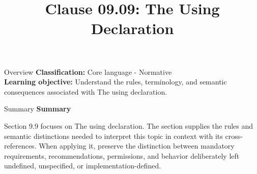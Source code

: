 \documentclass[10pt,letterpaper]{article}
\title{Clause 09.09: The Using Declaration}
\author{}
\date{}
\begin{document}
\maketitle
\begin{CornellOverviewBox}{Overview}
\textbf{Classification:} Core language - Normative\\[2pt]
\textbf{Learning objective:} Understand the rules, terminology, and semantic consequences associated with The using declaration.
\end{CornellOverviewBox}\begin{CornellSummaryBox}{Summary}
{\sffamily\bfseries\color{Accent} Summary}\par\vspace{3pt}Section 9.9 focuses on The using declaration. The section supplies the rules and semantic distinctions needed to interpret this topic in context with its cross-references. When applying it, preserve the distinction between mandatory requirements, recommendations, permissions, and behavior deliberately left undefined, unspecified, or implementation-defined.
\end{CornellSummaryBox}
\end{document}
